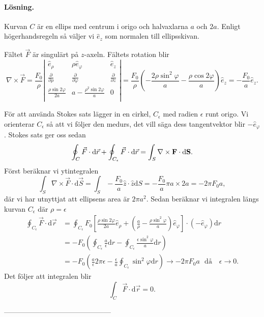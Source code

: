 \documentclass[%
oneside,                 %
final,                   %
10pt]{article}
\begin{document}
\paragraph{Lösning.}
Kurvan $C$ är en ellips med centrum i origo och halvaxlarna $a$ och $2a$. Enligt högerhandsregeln så väljer vi $\hat{e}_{z}$ som normalen till ellipsskivan.

Fältet $\vec{F}$ är singulärt på $z$-axeln.  Fältets rotation blir
\begin{equation}
  \nabla \times \vec{F} = \frac{F_0}{\rho} \left|
  \begin{array}{ccc}
\hat{e}_{\rho} & \rho \hat{e}_{\varphi} & \hat{e}_{z} \\
\frac{\partial}{\partial \rho} & \frac{\partial}{\partial \varphi} &
\frac{\partial}{\partial z} \\
\frac{\rho \sin 2\varphi}{2a} & a- 
\frac{\rho^2\sin 2 \varphi}{a} & 0\\
\end{array}
\right| = \frac{F_0}{\rho} \left(-\frac{2\rho \sin^2\varphi}{a} -
\frac{\rho\cos 2\varphi}{a}\right) \hat{e}_{z} =
- \frac{F_0}{a}\hat{e}_{z}.
\end{equation}

För att använda Stokes sats lägger in en cirkel, $C_\epsilon$ med radien $\epsilon$ runt origo.  Vi orienterar $C_\epsilon$ så att vi följer den medurs, det vill säga dess tangentvektor blir $-\hat{e}_{\varphi}$. Stokes sats ger oss sedan
\begin{equation}
  \oint_C \vec{F} \cdot \mbox{d}\vec{r} + \oint_{C_\epsilon} \vec{F} \cdot \mbox{d}\vec{r}
= \int_S {\bf \nabla \times F \cdot \mbox{d}S}.
\end{equation}
Först beräknar vi ytintegralen
\begin{equation}
  \int_S \nabla \times \vec{F} \cdot \mbox{d}\vec{S} = \int_S -\frac{F_0}{a} \hat{z} \cdot \hat{z} \mbox{d}S = - \frac{F_0}{a} \pi a\times 2a = -2\pi F_0 a,
\end{equation}
där vi har utnyttjat att ellipsens area är $2\pi a^2$.  Sedan beräknar vi integralen längs kurvan $C_\epsilon$ där $\rho = \epsilon$
\begin{align}
  \oint_{C_\epsilon} \vec{F} \cdot \mbox{d}\vec{r} &= \oint_{C_\epsilon} F_0 
\left[\frac{\rho \sin 2\varphi}{2a} \hat{e}_{\rho} + \left(\frac{a}{\rho}-
\frac{\rho \sin^2\varphi}{a}\right) \hat{e}_{\varphi}\right] \cdot 
\left(-\hat{e}_{\varphi}\right) \mbox{d}r \nonumber \\
&= -F_0\left( 
\oint_{C_\epsilon}\frac{a}{\epsilon} \mbox{d}r - \oint_{C_\epsilon}
\frac{\epsilon \sin^2 \varphi}{a} \mbox{d}r\right) \nonumber \\ 
&= -F_0 
\left(\frac{a}{\epsilon} 2\pi \epsilon - \frac{\epsilon}{a} \oint_{C_\epsilon}
\sin^2 \varphi \mbox{d}r\right) \to -2\pi F_0 a \,\,\,\,\mbox{då } \,\,\,\,
\epsilon \to 0.
\end{align}
Det följer att integralen blir
\begin{equation}
  \int_C \vec{F} \cdot \mbox{d}\vec{r} = 0.
\end{equation}

---------------------------------------------



\printindex
\end{document}
